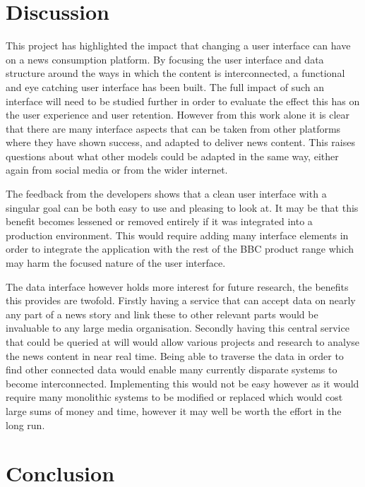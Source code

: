 \documentclass[12pt,titlepage]{article}
\begin{document}
\section{Discussion}

  This project has highlighted the impact that changing a user interface can
  have on a news consumption platform. By focusing the user interface and data
  structure around the ways in which the content is interconnected, a functional
  and eye catching user interface has been built. The full impact of such an
  interface will need to be studied further in order to evaluate the effect this
  has on the user experience and user retention. However from this work alone it
  is clear that there are many interface aspects that can be taken from other
  platforms where they have shown success, and adapted to deliver news content.
  This raises questions about what other models could be adapted in the same
  way, either again from social media or from the wider internet.

  The feedback from the developers shows that a clean user interface with a
  singular goal can be both easy to use and pleasing to look at. It may be that
  this benefit becomes lessened or removed entirely if it was integrated into a
  production environment. This would require adding many interface elements in
  order to integrate the application with the rest of the BBC product range
  which may harm the focused nature of the user interface.

  The data interface however holds more interest for future research, the
  benefits this provides are twofold. Firstly having a service that can accept
  data on nearly any part of a news story and link these to other relevant parts
  would be invaluable to any large media organisation. Secondly having this
  central service that could be queried at will would allow various projects and
  research to analyse the news content in near real time. Being able to traverse
  the data in order to find other connected data would enable many currently
  disparate systems to become interconnected. Implementing this would not be
  easy however as it would require many monolithic systems to be modified or
  replaced which would cost large sums of money and time, however it may well be
  worth the effort in the long run.

\section{Conclusion}
\end{document}
